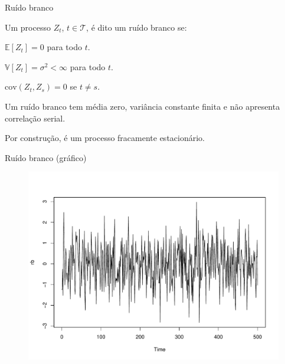 \documentclass[11pt]{beamer}
\newenvironment{wideitemize}{\itemize\addtolength{\itemsep}{10pt}}{\enditemize}
\newenvironment{halfwideitemize}{\itemize\addtolength{\itemsep}{0.5em}}{\enditemize}
\newenvironment{halfwideenumerate}{\enumerate\addtolength{\itemsep}{0.5em}}{\endenumerate}
\begin{document}
	
	\begin{frame}{Ruído branco}
	\begin{wideitemize}
		\item Um processo $Z_t$, $t \in \mathcal{T}$, é dito um {\color{blue}ruído branco} se:
		\begin{halfwideenumerate}
			\item $\mathbb{E}[Z_t] = 0$ para todo $t$.
			\item $\mathbb{V}[Z_t] = \sigma^2 < \infty$ para todo $t$.
			\item $\text{cov}(Z_t, Z_s) = 0$ se $t \neq s$.
		\end{halfwideenumerate}
		\item Um ruído branco tem média zero, variância constante finita e não apresenta correlação serial.
		\begin{halfwideitemize}
			\item Por construção, é um processo fracamente estacionário.
		\end{halfwideitemize}
	\end{wideitemize}
\end{frame}
\begin{frame}{Ruído branco (gráfico)}
	\begin{figure}
		\includegraphics[scale=0.5]{graficos/rb.pdf}
	\end{figure}
\end{frame}
\end{document}
